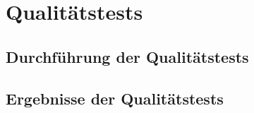 \chapter{Qualitätstests}

\section{Durchführung der Qualitätstests}

\section{Ergebnisse der Qualitätstests}